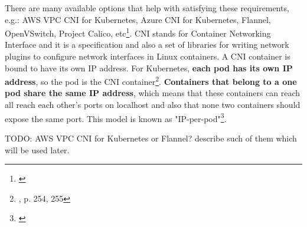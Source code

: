 \documentclass[12pt]{article}
\begin{document}
There are many available options that help with satisfying these requirements, e.g.: AWS VPC CNI for Kubernetes, Azure CNI for Kubernetes, Flannel, OpenVSwitch, Project Calico, etc\footnote{\cite{k8s-net}}. CNI stands for Container Networking Interface and it is a specification and also a set of libraries for writing network plugins to configure network interfaces in Linux containers. A CNI container is bound to have its own IP address. For Kubernetes, \textbf{each pod has its own IP address}, so the pod is the CNI container\footnote{\cite{book-mastering-k8s}, p. 254, 255}. \textbf{Containers that belong to a one pod share the same IP address}, which means that these containers can reach all reach each other’s ports on localhost and also that none two containers should expose the same port. This model is known as "IP-per-pod"\footnote{\cite{k8s-net}}.

TODO: AWS VPC CNI for Kubernetes or Flannel? describe such of them which will be used later.



\printbibliography
\end{document}
